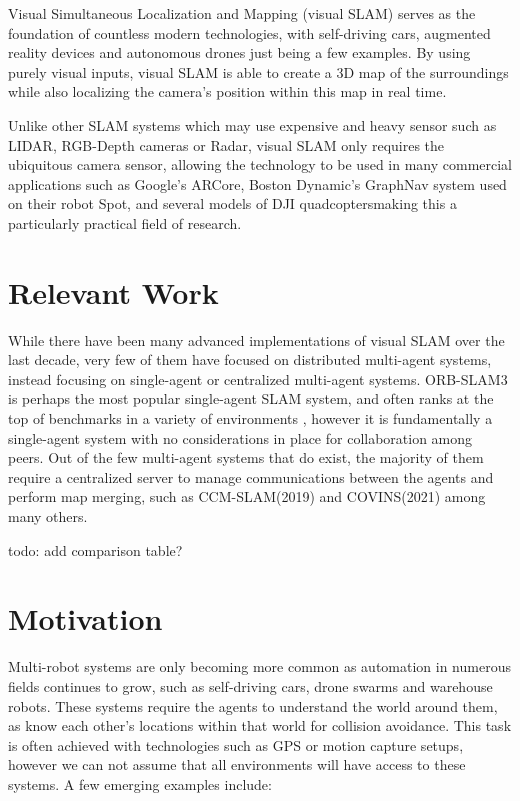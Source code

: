 
\label{sec:introduction}
Visual Simultaneous Localization and Mapping (visual SLAM) serves as the foundation of countless modern technologies, with self-driving cars, augmented reality devices and autonomous drones just being a few examples. By using purely visual inputs, visual SLAM is able to create a 3D map of the surroundings while also localizing the camera's position within this map in real time.

Unlike other SLAM systems which may use expensive and heavy sensor such as LIDAR, RGB-Depth cameras or Radar, visual SLAM only requires the ubiquitous camera sensor, allowing the technology to be used in many commercial applications such as Google's ARCore\footnotemark[1], Boston Dynamic's GraphNav system used on their robot Spot\footnotemark[2], and several models of DJI quadcopters\footnotemark[3] making this a particularly practical field of research.


\section{Relevant Work}
\label{sec:relevant-work}
While there have been many advanced implementations of visual SLAM over the last decade, very few of them have focused on distributed multi-agent systems, instead focusing on single-agent or centralized multi-agent systems. ORB-SLAM3 \autocite{ORBSLAM3_TRO} is perhaps the most popular single-agent SLAM system, and often ranks at the top of benchmarks in a variety of environments \autocite{DBLP:journals/corr/abs-2108-01654}, however it is fundamentally a single-agent system with no considerations in place for collaboration among peers. Out of the few multi-agent systems that do exist, the majority of them require a centralized server to manage communications between the agents and perform map merging, such as CCM-SLAM(2019) \autocite{schmuck2019ccm} and COVINS(2021) \autocite{schmuck2021covins} among many others.

todo: add comparison table?

\section{Motivation}
\label{sec:motivation}
Multi-robot systems are only becoming more common as automation in numerous fields continues to grow, such as self-driving cars, drone swarms and warehouse robots. These systems require the agents to understand the world around them, as know each other's locations within that world for collision avoidance. This task is often achieved with technologies such as GPS or motion capture setups, however we can not assume that all environments will have access to these systems. A few emerging examples include: \noparskip
\smallbreak

